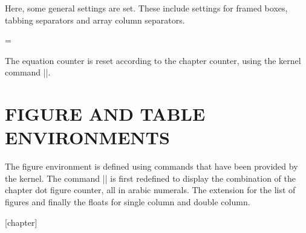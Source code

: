 \begin{multicols}{2}
 Here, some general settings are set. These include settings for framed boxes, tabbing separators and array column separators.

\end{multicols}
\begin{teX}
\setlength{}
\setlength{}
\setlength{}
\setlength{}
\setlength{}
\skip\@mpfootins = \skip\footins
\setlength{}
\setlength{}
\end{teX}

\begin{multicols}{2}
The equation counter is reset according to the chapter counter, using the \latex kernel command |\@addtoreset|. 

\end{multicols}
\begin{teX}
\renewcommand\theequation
  {\ifnum \c@chapter>\z@ \thechapter.\fi \@arabic\c@equation}
\end{teX}

\section*{FIGURE AND TABLE ENVIRONMENTS}

\begin{multicols}{2}
 The figure environment is defined using commands that have been provided by the kernel.  The command |\thefigure| is first redefined to display the combination of the chapter dot figure counter, all in arabic numerals. The extension for the list of figures and finally the floats for single column and double column.

\end{multicols}


\begin{teX}
[chapter]
\renewcommand \thefigure
     {\ifnum \c@chapter>\z@ \thechapter.\fi \@arabic\c@figure}
\def\fps@figure{tbp}
\def\ftype@figure{1}
\def\ext@figure{lof}
\def\fnum@figure{\figurename\nobreakspace\thefigure}
\newenvironment{figure}
               {\@float{figure}}
               {\end@float}
\newenvironment{figure*}
               {\@dblfloat{figure}}
               {\end@dblfloat}
\end{teX}

